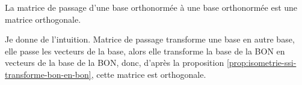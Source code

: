 \begin{prop}
   La matrice de passage d'une base orthonormée à une base orthonormée est une matrice orthogonale. 
\end{prop}
\begin{preuve}
   Je donne de l'intuition. Matrice de passage transforme une base en autre base, elle passe les vecteurs de la base, alors elle transforme la base de la BON en vecteurs de la base de la BON, donc, d'après la proposition \ref{prop:isometrie-ssi-transforme-bon-en-bon}, cette matrice est orthogonale.
\end{preuve}
